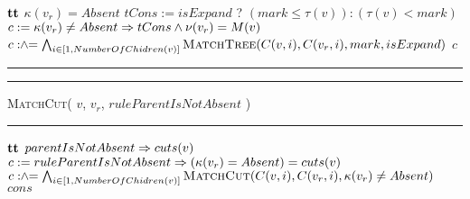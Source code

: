 \begin{algorithm}[H]
  \begin{algorithmic}[1]
     \Return $\mathbf{tt}$ \EndIIf
    \label{line:matchtree-vr-absent}
     \Return $\kappa(v_r) = Absent$ \EndIIf
    \label{line:matchtree-v-absent}
    \State $tCons := isExpand$ \;? $( mark \leq \tau(v) ): ( \tau(v) < mark )$
    \State $c := \kappa(v_r) \neq Absent \Rightarrow tCons \land \nu(v_r)= M(v) $
    \label{line:matchtree-cons}
    \State  $c \mathrel{:\hspace{-3pt}\land\hspace{-3pt}=} \bigwedge_{i \in [1,NumberOfChidren(v)]} \textsc{MatchTree}( C(v,i), C(v_r,i), mark, isExpand)$
    \label{line:matchtree-recurse}
    \State \Return $c$   
  \end{algorithmic}
  \hrule
  \vspace{1ex}
  \hrule\vspace{2pt}
  \textsc{MatchCut}( $v$, $v_r$, $ruleParentIsNotAbsent$ )\hfill\mbox{}
  \vspace{2pt}\hrule
  \begin{algorithmic}[1]
     \Return $\mathbf{tt}$ \EndIIf
    \label{line:mcut-no-v}
     \Return $parentIsNotAbsent \Rightarrow cuts(v)$ \EndIIf
    \label{line:mcut-no-vr}
    \State $c := ruleParentIsNotAbsent \Rightarrow ( \kappa(v_r) = Absent) = cuts(v)$
    \label{line:mcut-cons}
    \State $c \mathrel{:\hspace{-3pt}\land\hspace{-3pt}=} \bigwedge_{i \in [1,NumberOfChidren(v)]}\textsc{MatchCut}( C(v,i), C(v_r,i), \kappa(v_r) \neq Absent)$
    \label{line:mcut-kids}
    \State \Return $cons$
  \end{algorithmic}      

\end{algorithm}


